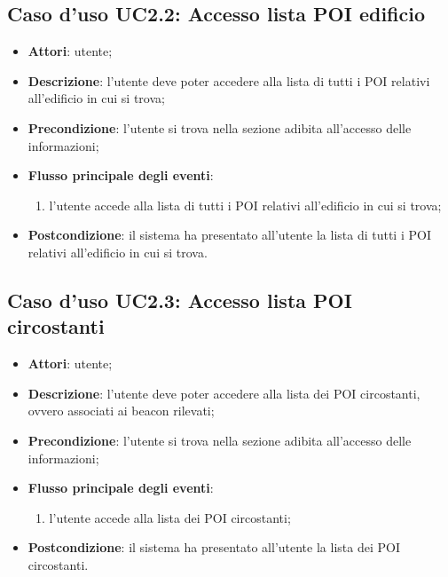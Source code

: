\documentclass[../AnalisiDeiRequisiti.tex]{subfiles}
\begin{document}
\subsection{Caso d'uso UC2.2: Accesso lista POI edificio}

\begin{itemize}
\item \textbf{Attori}: utente;
\item \textbf{Descrizione}: l'utente deve poter accedere alla lista di tutti i POI relativi all'edificio in cui si trova; 
      \item \textbf{Precondizione}: l'utente si trova nella sezione adibita all'accesso delle informazioni;

        \item \textbf{Flusso principale degli eventi}:
          \begin{enumerate}
          \item l'utente accede alla lista di tutti i POI relativi all'edificio in cui si trova;

      \end{enumerate}
    \item \textbf{Postcondizione}: il sistema ha presentato all'utente la lista di tutti i POI relativi all'edificio in cui si trova.
  \end{itemize}
\hypertarget{UC2.3}{}
\subsection{Caso d'uso UC2.3: Accesso lista POI circostanti}
\begin{itemize}
\item \textbf{Attori}: utente;
\item \textbf{Descrizione}: l'utente deve poter accedere alla lista dei POI circostanti, ovvero associati ai beacon rilevati; 
      \item \textbf{Precondizione}: l'utente si trova nella sezione adibita all'accesso delle informazioni;

        \item \textbf{Flusso principale degli eventi}:
          \begin{enumerate}
          \item l'utente accede alla lista dei POI circostanti;

      \end{enumerate}
    \item \textbf{Postcondizione}: il sistema ha presentato all'utente la lista dei POI circostanti.
  \end{itemize}
\hypertarget{UC2.4}{}
\end{document}
